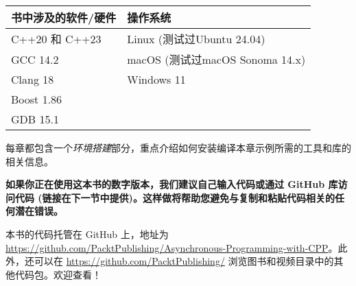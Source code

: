\begin{longtable}{|l|l|}
\hline
\textbf{书中涉及的软件/硬件} & \textbf{操作系统}                \\ \hline
\endfirsthead
%
\endhead
%
C++20 和 C++23       & Linux (测试过Ubuntu 24.04)      \\ \hline
GCC 14.2            & macOS (测试过macOS Sonoma 14.x) \\ \hline
Clang 18            & Windows 11                   \\ \hline
Boost 1.86          &                              \\ \hline
GDB 15.1            &                              \\ \hline
\end{longtable}

每章都包含一个\textit{环境搭建}部分，重点介绍如何安装编译本章示例所需的工具和库的相关信息。

\textbf{如果你正在使用这本书的数字版本，我们建议自己输入代码或通过 GitHub 库访问代码 (链接在下一节中提供)。这样做将帮助您避免与复制和粘贴代码相关的任何潜在错误。}


本书的代码托管在 GitHub 上，地址为 \url{https://github.com/PacktPublishing/Asynchronous-Programming-with-CPP}。此外，还可以在 \url{https://github.com/PacktPublishing/} 浏览图书和视频目录中的其他代码包。欢迎查看！
